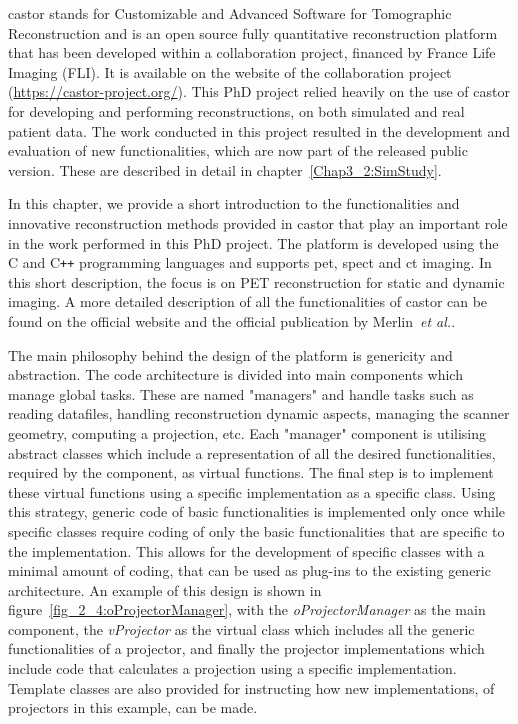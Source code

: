 \Gls{castor} stands for Customizable and Advanced Software for Tomographic Reconstruction and is an open source fully quantitative reconstruction platform that has been developed within a collaboration project, financed by France Life Imaging (FLI). It is available on the website of the collaboration project {(\url{https://castor-project.org/})}.
This PhD project relied heavily on the use of \gls{castor} for developing and performing reconstructions, on both simulated and real patient data. The work conducted in this project resulted in the development and evaluation of new functionalities, which are now part of the released public version. These are described in detail in chapter~\ref{Chap3_2:SimStudy}. 

In this chapter, we provide a short introduction to the functionalities and innovative reconstruction methods provided in \gls{castor} that play an important role in the work performed in this PhD project. 
The platform is developed using the C and C\texttt{++} programming languages and supports \gls{pet}, \gls{spect} and \gls{ct} imaging. 
In this short description, the focus is on PET reconstruction for static and dynamic imaging. A more detailed description of all the functionalities of \gls{castor} can be found on the official website and the official publication by Merlin~\textit{et al.}\cite{Merlin2018}. 

The main philosophy behind the design of the platform is genericity and abstraction. The code architecture is divided into main components which manage global tasks. These are named "managers" and handle tasks such as reading datafiles, handling reconstruction dynamic aspects, managing the scanner geometry, computing a projection, etc. 
Each "manager" component is utilising abstract classes which include a representation of all the desired functionalities, required by the component, as virtual functions. The final step is to implement these virtual functions using a specific implementation as a specific class. 
Using this strategy, generic code of basic functionalities is implemented only once while specific classes require coding of only the basic functionalities that are specific to the implementation. This allows for the development of specific classes with a minimal amount of coding, that can be used as plug-ins to the existing generic architecture. 
An example of this design is shown in figure~\ref{fig_2_4:oProjectorManager}, with the \textit{oProjectorManager} as the main component, the \textit{vProjector} as the virtual class which includes all the generic functionalities of a projector, and finally the projector implementations which include code that calculates a projection using a specific implementation. Template classes are also provided for instructing how new implementations, of projectors in this example, can be made. 

